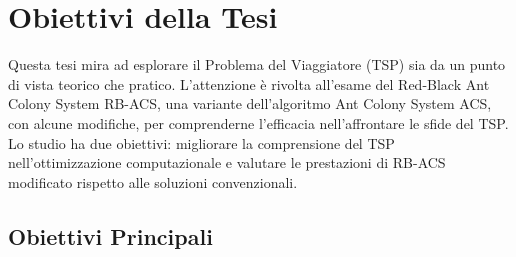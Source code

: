 
\section{Obiettivi della Tesi}



Questa tesi mira ad esplorare il Problema del Viaggiatore (TSP) sia da un punto di vista teorico che pratico. L'attenzione è rivolta all'esame del Red-Black Ant Colony System \gls{RB-ACS}, una variante dell'algoritmo Ant Colony System \gls{ACS}, con alcune modifiche, per comprenderne l'efficacia nell'affrontare le sfide del \gls{TSP}.  Lo studio ha due obiettivi: migliorare la comprensione del \gls{TSP} nell'ottimizzazione computazionale e valutare le prestazioni di \gls{RB-ACS} modificato rispetto alle soluzioni convenzionali.

\subsection{Obiettivi Principali}


